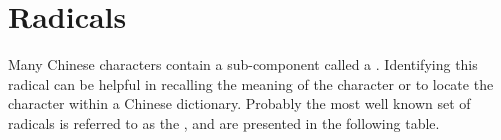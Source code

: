 \section{Radicals}
\begin{minipage}{\tw-60mm}
Many Chinese characters contain a sub-component called a .
Identifying this radical can be helpful in recalling the meaning of the character or to
locate the character within a Chinese dictionary.
Probably the most well known set of radicals is referred to as the
, and are presented in the following table.\footnotemark
\end{minipage}\hfill%

